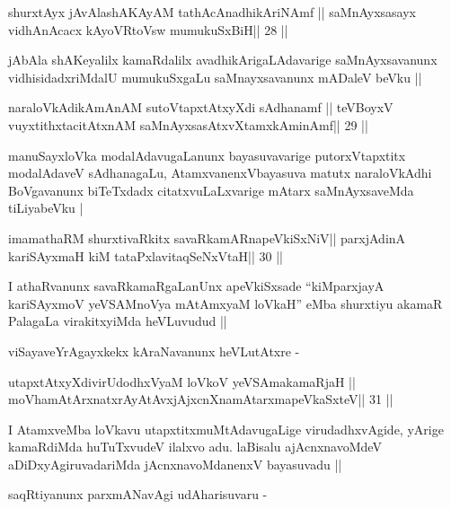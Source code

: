 \begin{shl}
\footnotemark[1]shurxtAyx jAvAlashAKAyAM tathAcAnadhikAriNAmf ||
saMnAyxsasayx vidhAnAcacx kAyoVR\s toV\s sw mumukuSxBiH\hfill || 28 ||
\end{shl}

\begin{artha}
jAbAla shAKeyalilx kamaRdalilx avadhikArigaLAdavarige saMnAyxsavanunx
vidhisidadxriMdalU mumukuSxgaLu saMnayxsavanunx mADaleV beVku ||
\end{artha}

\begin{shl}
naraloVkAdikAmAnAM sutoVtapxtAtxyXdi sAdhanamf ||
teVBoyxV vuyxtithxtacitAtxnAM saMnAyxsasAtxvXtamxkAminAmf\hfill || 29 ||
\end{shl}

\begin{artha}
manuSayxloVka modalAdavugaLanunx bayasuvavarige putorxVtapxtitx
modalAdaveV sAdhanagaLu, AtamxvanenxVbayasuva matutx naraloVkAdhi
BoVgavanunx biTeTxdadx citatxvuLaLxvarige mAtarx saMnAyxsaveMda
tiLiyabeVku |
\end{artha}

\begin{shl}
imamathaRM shurxtivaRkitx savaRkamARnapeVkiSxNiV||
parxjAdinA kariSAyxmaH kiM tataPxlavitaqSeNxVtaH\hfill || 30 ||
\end{shl}

\begin{artha}
I athaRvanunx savaRkamaRgaLanUnx apeVkiSxsade ``kiMparxjayA
kariSAyxmoV yeVSAMnoV\s ya mAtAmxyaM loVkaH'' eMba shurxtiyu akamaR
PalagaLa virakitxyiMda  heVLuvudud ||
\end{artha}

\begin{artha}
viSayaveYrAgayxkekx kAraNavanunx heVLutAtxre -
\end{artha}

\begin{shl}
utapxtAtxyXdivirUdodhxV\s yaM loVkoV yeVSAmakamaRjaH ||
moVhamAtArxnatxrAyAtAvxjAjxcnXnamAtarxmapeVkaSxteV\hfill || 31 ||
\end{shl}

\begin{artha}
I AtamxveMba loVkavu utapxtitxmuMtAdavugaLige virudadhxvAgide, yArige
kamaRdiMda huTuTxvudeV ilalxvo adu. laBisalu ajAcnxnavoMdeV
aDiDxyAgiruvadariMda jAcnxnavoMdanenxV bayasuvadu ||

saqRtiyanunx parxmANavAgi udAharisuvaru -
\end{artha}


